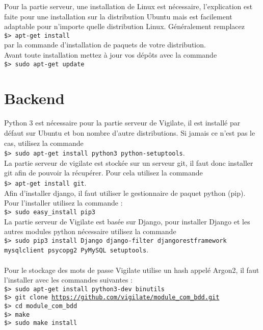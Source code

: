 Pour la partie serveur, une installation de Linux est nécessaire, l’explication est faite pour une installation sur la distribution Ubuntu mais est facilement adaptable pour n’importe quelle distribution Linux. Généralement remplacez\\
\texttt{\$> apt-get install}\\
par la commande d’installation de paquets de votre distribution.\\
Avant toute installation mettez à jour vos dépôts avec la commande\\
\texttt{\$> sudo apt-get update}\\
\section{Backend}
Python 3 est nécessaire pour la partie serveur de Vigilate, il est installé par défaut sur Ubuntu et bon nombre d’autre distributions. Si jamais ce n’est pas le cas, utilisez la commande\\
\texttt{\$> sudo apt-get install python3 python-setuptools}.\\
La partie serveur de vigilate est stockée sur un serveur git, il faut donc installer git afin de pouvoir la récupérer. Pour cela utilisez la commande\\
\texttt{\$> apt-get install git}.\\
Afin d’installer django, il faut utiliser le gestionnaire de paquet python (pip). Pour l’installer utilisez la commande :\\
\texttt{\$> sudo easy\_install pip3}\\
La partie serveur de Vigilate est basée sur Django, pour installer Django et les autres modules python nécessaire utilisez la commande\\
\texttt{\$> sudo pip3 install Django django-filter djangorestframework mysqlclient psycopg2 PyMySQL setuptools}.\\
\\
Pour le stockage des mots de passe Vigilate utilise un hash appelé Argon2, il faut l’installer avec les commandes suivantes :\\
\texttt{\$> sudo apt-get install python3-dev binutils}\\
\texttt{\$> git clone \url{https://github.com/vigilate/module_com_bdd.git}}\\
\texttt{\$> cd module\_com\_bdd}\\
\texttt{\$> make}\\
\texttt{\$> sudo make install}\\
